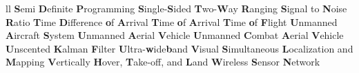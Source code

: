 \documentclass[
	12pt, %
	english, %
	onehalfspacing, %
	liststotoc, %
	toctotoc, %
	parskip, %
	headsepline, %
]{MastersDoctoralThesis} %
\begin{document}
\begin{abbreviations}{ll}
			{\textbf{S}emi \textbf{D}efinite \textbf{P}rogramming}
			{\textbf{S}ingle-\textbf{S}ided \textbf{T}wo-\textbf{W}ay \textbf{R}anging}
			{\textbf{S}ignal to \textbf{N}oise \textbf{R}atio}
			{\textbf{T}ime \textbf{D}ifference \textbf{o}f \textbf{A}rrival}
			{\textbf{T}ime \textbf{o}f \textbf{A}rrival}
			{\textbf{T}ime \textbf{o}f \textbf{F}light}
			{\textbf{U}nmanned \textbf{A}ircraft \textbf{S}ystem}
			{\textbf{U}nmanned \textbf{A}erial \textbf{V}ehicle}
			{\textbf{U}nmanned \textbf{C}ombat \textbf{A}erial \textbf{V}ehicle}
			{\textbf{U}nscented \textbf{K}alman \textbf{F}ilter}
			{\textbf{U}ltra-\textbf{w}ide\textbf{b}and}
			{\textbf{V}isual \textbf{S}imultaneous \textbf{L}ocalization and \textbf{M}apping}
			{\textbf{V}ertically \textbf{H}over, \textbf{T}ake-off, and \textbf{L}and}
			{\textbf{W}ireless \textbf{S}ensor \textbf{N}etwork}
\end{abbreviations}




\pagestyle{thesis} %
\mainmatter %

\end{document}
